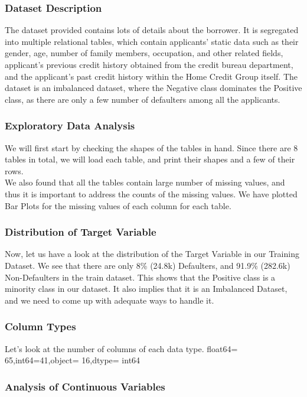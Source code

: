\documentclass[twoside,a4paper]{article}
\begin{document}
\subsubsection{Dataset Description}
The dataset provided contains lots of details about the borrower. It is segregated into multiple relational tables, which contain applicants’ static data such as their gender, age, number of family members, occupation, and other related fields, applicant’s previous credit history obtained from the credit bureau department, and the applicant’s past credit history within the Home Credit Group itself. The dataset is an imbalanced dataset, where the Negative class dominates the Positive class, as there are only a few number of defaulters among all the applicants.
\subsubsection{Exploratory Data Analysis}
We will first start by checking the shapes of the tables in hand. Since there are 8 tables in total, we will load each table, and print their shapes and a few of their rows.\\
We also found that all the tables contain large number of missing values, and thus it is important to address the counts of the missing values. We have plotted Bar Plots for the missing values of each column for each table.
\subsubsection{Distribution of Target Variable}

Now, let us have a look at the distribution of the Target Variable in our Training Dataset. We see that there are only 8\% (24.8k) Defaulters, and 91.9\% (282.6k) Non-Defaulters in the train dataset. This shows that the Positive class is a minority class in our dataset. It also implies that it is an Imbalanced Dataset, and we need to come up with adequate ways to handle it.

\subsubsection{Column Types}
Let's look at the number of columns of each data type.  float64= 65,int64=41,object= 16,dtype= int64
\subsubsection{Analysis of Continuous Variables}
\end{document}
